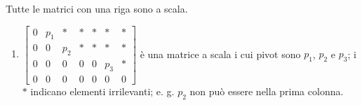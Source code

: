 \documentclass{article}
\begin{document}
Tutte le matrici con una riga sono a scala.

\begin{enumerate}
\item $\left[ 
\begin{array}{ccccccc}
0 & p_{1} & \ast & \ast & \ast & \ast & \ast \\ 
0 & 0 & p_{2} & \ast & \ast & \ast & \ast \\ 
0 & 0 & 0 & 0 & 0 & p_{3} & \ast \\ 
0 & 0 & 0 & 0 & 0 & 0 & 0%
\end{array}%
\right] $ \`{e} una matrice a scala i cui pivot sono $p_{1}$, $p_{2}$ e $%
p_{3}$; i $\ast $ indicano elementi irrilevanti; e. g. $p_{2}$ non pu\`{o}
essere nella prima colonna.
\end{enumerate}
\end{document}
